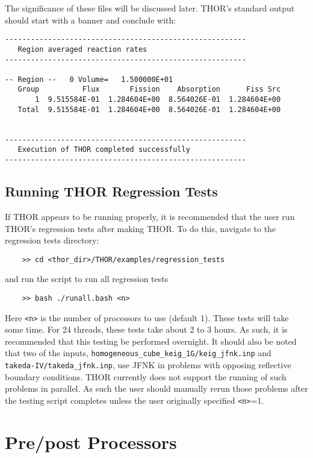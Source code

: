 The significance of these files will be discussed later.
\ac{THOR}'s standard output should start with a banner and conclude with:
\begin{verbatim}
--------------------------------------------------------
   Region averaged reaction rates
--------------------------------------------------------

-- Region --   0 Volume=   1.500000E+01
   Group          Flux       Fission    Absorption      Fiss Src
       1  9.515584E-01  1.284604E+00  8.564026E-01  1.284604E+00
   Total  9.515584E-01  1.284604E+00  8.564026E-01  1.284604E+00


--------------------------------------------------------
   Execution of THOR completed successfully
--------------------------------------------------------
\end{verbatim}

\subsection{Running THOR Regression Tests}

If \ac{THOR} appears to be running properly, it is recommended that the user run \ac{THOR}'s regression tests after making \ac{THOR}.
To do this, navigate to the regression tests directory:
\begin{verbatim}
    >> cd <thor_dir>/THOR/examples/regression_tests
\end{verbatim}
and run the script to run all regression tests
\begin{verbatim}
    >> bash ./runall.bash <n>
\end{verbatim}
Here \verb"<n>" is the number of processors to use (default 1).
These tests will take some time.
For 24 threads, these tests take about 2 to 3 hours.
As such, it is recommended that this testing be performed overnight.
It should also be noted that two of the inputs, \verb"homogeneous_cube_keig_1G/keig_jfnk.inp" and \\
\verb"takeda-IV/takeda_jfnk.inp", use JFNK in problems with opposing reflective boundary conditions.
\ac{THOR} currently does not support the running of such problems in parallel.
As such the user should manually rerun those problems after the testing script completes unless the user originally specified \verb"<n>"=1.

\section{Pre/post Processors}

